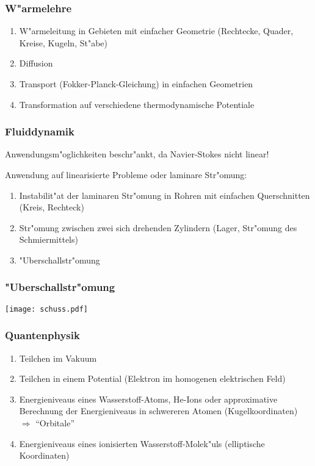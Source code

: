 \documentclass{beamer}
\begin{document}
\begin{frame}
\frametitle{W"armelehre}
\begin{enumerate}
\item W"armeleitung in Gebieten mit einfacher
Geometrie (Rechtecke, Quader, Kreise, Kugeln, St"abe)
\item Diffusion
\item Transport (Fokker-Planck-Gleichung) in einfachen Geometrien
\item Transformation auf verschiedene thermodynamische Potentiale
\end{enumerate}
\end{frame}

\begin{frame}
\frametitle{Fluiddynamik}

Anwendungsm"oglichkeiten beschr"ankt, da Navier-Stokes nicht linear!

\medskip

Anwendung auf linearisierte Probleme oder laminare Str"omung:
\begin{enumerate}
\item Instabilit"at der laminaren Str"omung in Rohren mit einfachen
Querschnitten (Kreis, Rechteck)
\item Str"omung zwischen zwei sich drehenden Zylindern (Lager, Str"omung
des Schmiermittels)
\item "Uberschallstr"omung
\end{enumerate}
\end{frame}

\begin{frame}
\frametitle{"Uberschallstr"omung}
\begin{center}
\texttt{[image: schuss.pdf]}
\end{center}
\end{frame}

\begin{frame}
\frametitle{Quantenphysik}
\begin{enumerate}
\item Teilchen im Vakuum
\item Teilchen in einem Potential (Elektron im homogenen elektrischen Feld)
\item Energieniveaus eines Wasserstoff-Atoms, He-Ions oder approximative
Berechnung der Energieniveaus in schwereren Atomen
(Kugelkoordinaten) $\Rightarrow$ ``Orbitale''
\item Energieniveaus eines ionisierten Wasserstoff-Molek"uls (elliptische Koordinaten)
\end{enumerate}
\end{frame}
\end{document}
